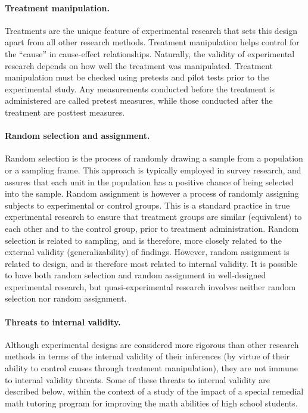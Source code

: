 \paragraph{Treatment manipulation.} Treatments are the unique feature of experimental research that sets this design apart from all other research methods. Treatment manipulation helps control for the “cause” in cause-effect relationships. Naturally, the validity of experimental research depends on how well the treatment was manipulated. Treatment manipulation must be checked using pretests and pilot tests prior to the experimental study. Any measurements conducted before the treatment is administered are called pretest measures, while those conducted after the treatment are posttest measures. 

\paragraph{Random selection and assignment.} Random selection is the process of randomly drawing a sample from a population or a sampling frame. This approach is typically employed in survey research, and assures that each unit in the population has a positive chance of being selected into the sample. Random assignment is however a process of randomly assigning subjects to experimental or control groups. This is a standard practice in true experimental research to ensure that treatment groups are similar (equivalent) to each other and to the control group, prior to treatment administration. Random selection is related to sampling, and is therefore, more closely related to the external validity (generalizability) of findings. However, random assignment is related to design, and is therefore most related to internal validity. It is possible to have both random selection and random assignment in well-designed experimental research, but quasi-experimental research involves neither random selection nor random assignment.

\paragraph{Threats to internal validity.} Although experimental designs are considered more rigorous than other research methods in terms of the internal validity of their inferences (by virtue of their ability to control causes through treatment manipulation), they are not immune to internal validity threats. Some of these threats to internal validity are described below, within the context of a study of the impact of a special remedial math tutoring program for improving the math abilities of high school students.

